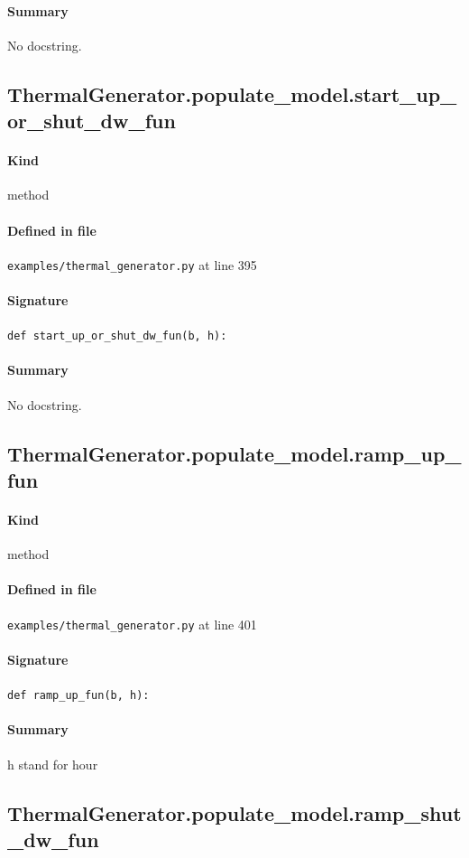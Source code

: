 \documentclass[11pt]{report}
\begin{document}
\paragraph{Summary} No docstring.
\subsection{ThermalGenerator.populate\_model.start\_up\_or\_shut\_dw\_fun}
\label{def:examples-thermal_generator.py:ThermalGenerator.populate_model.start_up_or_shut_dw_fun:L395}
\paragraph{Kind} method
\paragraph{Defined in file} \texttt{examples/thermal\_generator.py} at line 395
\paragraph{Signature} \texttt{def start\_up\_or\_shut\_dw\_fun(b, h):}
\paragraph{Summary} No docstring.
\subsection{ThermalGenerator.populate\_model.ramp\_up\_fun}
\label{def:examples-thermal_generator.py:ThermalGenerator.populate_model.ramp_up_fun:L401}
\paragraph{Kind} method
\paragraph{Defined in file} \texttt{examples/thermal\_generator.py} at line 401
\paragraph{Signature} \texttt{def ramp\_up\_fun(b, h):}
\paragraph{Summary} h stand for hour
\subsection{ThermalGenerator.populate\_model.ramp\_shut\_dw\_fun}
\label{def:examples-thermal_generator.py:ThermalGenerator.populate_model.ramp_shut_dw_fun:L423}
\end{document}
